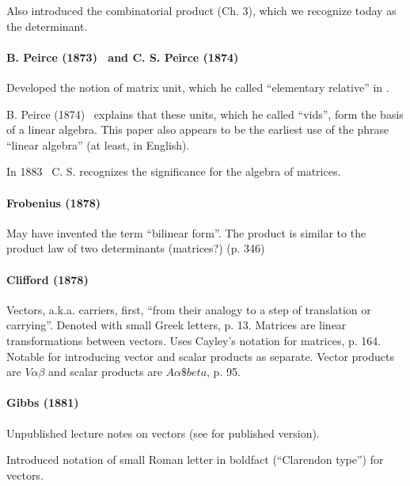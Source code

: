 Also introduced the combinatorial product (Ch. 3), which we recognize today as the determinant.


\paragraph{B. Peirce (1873)~\cite{Peirce1873} and C. S. Peirce (1874)~\cite{Peirce1874}}

Developed the notion of matrix unit, which he called ``elementary relative'' in \cite[p.359]{Peirce1873}.

B. Peirce (1874)~\cite{Peirce1874} explains that these units, which he called ``vids'', form the basis of a linear algebra.
This paper also appears to be the earliest use of the phrase ``linear algebra'' (at least, in English).

In 1883~\cite{Peirce1883} C. S. recognizes the significance for the algebra of matrices.

\paragraph{Frobenius (1878)~\cite{Frobenius1878}}

May have invented the term ``bilinear form''.
The product is similar to the product law of two determinants (matrices?) (p. 346)


\paragraph{Clifford (1878)~\cite{Clifford1878}}

Vectors, a.k.a. carriers, first, ``from their analogy to a step of translation or carrying''.
Denoted with small Greek letters, p. 13.
Matrices are linear transformations between vectors. Uses Cayley's notation for matrices, p. 164.
Notable for introducing vector and scalar products as separate.
Vector products are $V\alpha\beta$ and scalar products are $A\alpha\$beta$, p. 95.



\paragraph{Gibbs (1881)~\cite{Gibbs1881}}

Unpublished lecture notes on vectors (see \cite{Wilson1901} for published version).

Introduced notation of small Roman letter in boldfact (``Clarendon type'') for vectors.

